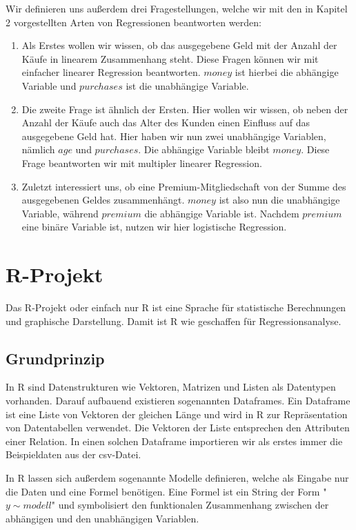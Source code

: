 Wir definieren uns außerdem drei Fragestellungen, welche wir mit den in Kapitel 2 vorgestellten Arten von Regressionen beantworten werden:
\begin{enumerate}
  \item Als Erstes wollen wir wissen, ob das ausgegebene Geld mit der Anzahl der Käufe in linearem Zusammenhang steht. Diese Fragen können wir mit einfacher linearer Regression beantworten. $money$ ist hierbei die abhängige Variable und $purchases$ ist die unabhängige Variable.
  \item Die zweite Frage ist ähnlich der Ersten. Hier wollen wir wissen, ob neben der Anzahl der Käufe auch das Alter des Kunden einen Einfluss auf das ausgegebene Geld hat. Hier haben wir nun zwei unabhängige Variablen, nämlich $age$ und $purchases$. Die abhängige Variable bleibt $money$. Diese Frage beantworten wir mit multipler linearer Regression.
  \item Zuletzt interessiert uns, ob eine Premium-Mitgliedschaft von der Summe des ausgegebenen Geldes zusammenhängt. $money$ ist also nun die unabhängige Variable, während $premium$ die abhängige Variable ist. Nachdem $premium$ eine binäre Variable ist, nutzen wir hier logistische Regression.
\end{enumerate}

\section{R-Projekt}
\label{section:3:2}

Das R-Projekt oder einfach nur R ist eine Sprache für statistische Berechnungen und graphische Darstellung. Damit ist R wie geschaffen für Regressionsanalyse.

\subsection{Grundprinzip}
\label{subsection:3:2:1}

In R sind Datenstrukturen wie Vektoren, Matrizen und Listen als Datentypen vorhanden. Darauf aufbauend existieren sogenannten Dataframes. Ein Dataframe ist eine Liste von Vektoren der gleichen Länge und wird in R zur Repräsentation von Datentabellen verwendet. Die Vektoren der Liste entsprechen den Attributen einer Relation. In einen solchen Dataframe importieren wir als erstes immer die Beispieldaten aus der csv-Datei.

In R lassen sich außerdem sogenannte Modelle definieren, welche als Eingabe nur die Daten und eine Formel benötigen. Eine Formel ist ein String der Form "$y \sim modell$" und symbolisiert den funktionalen Zusammenhang zwischen der abhängigen und den unabhängigen Variablen.

